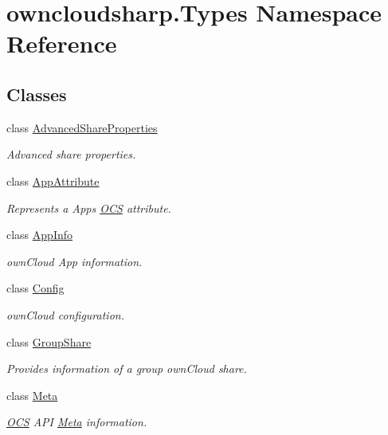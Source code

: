 \hypertarget{namespaceowncloudsharp_1_1_types}{}\section{owncloudsharp.\+Types Namespace Reference}
\label{namespaceowncloudsharp_1_1_types}
\subsection*{Classes}
\begin{DoxyCompactItemize}
\item 
class \hyperlink{classowncloudsharp_1_1_types_1_1_advanced_share_properties}{Advanced\+Share\+Properties}
\begin{DoxyCompactList}\small\item\em Advanced share properties. \end{DoxyCompactList}\item 
class \hyperlink{classowncloudsharp_1_1_types_1_1_app_attribute}{App\+Attribute}
\begin{DoxyCompactList}\small\item\em Represents a Apps \hyperlink{classowncloudsharp_1_1_types_1_1_o_c_s}{O\+C\+S} attribute. \end{DoxyCompactList}\item 
class \hyperlink{classowncloudsharp_1_1_types_1_1_app_info}{App\+Info}
\begin{DoxyCompactList}\small\item\em own\+Cloud App information. \end{DoxyCompactList}\item 
class \hyperlink{classowncloudsharp_1_1_types_1_1_config}{Config}
\begin{DoxyCompactList}\small\item\em own\+Cloud configuration. \end{DoxyCompactList}\item 
class \hyperlink{classowncloudsharp_1_1_types_1_1_group_share}{Group\+Share}
\begin{DoxyCompactList}\small\item\em Provides information of a group own\+Cloud share. \end{DoxyCompactList}\item 
class \hyperlink{classowncloudsharp_1_1_types_1_1_meta}{Meta}
\begin{DoxyCompactList}\small\item\em \hyperlink{classowncloudsharp_1_1_types_1_1_o_c_s}{O\+C\+S} A\+P\+I \hyperlink{classowncloudsharp_1_1_types_1_1_meta}{Meta} information. \end{DoxyCompactList}\item 

\end{DoxyCompactItemize}
